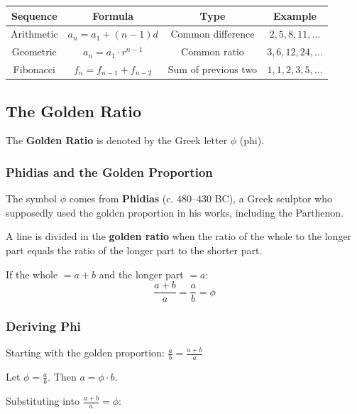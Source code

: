 \documentclass[11pt,a4paper]{article}
\begin{document}
\begin{center}
\begin{tabular}{c|c|c|c}
\toprule
\textbf{Sequence} & \textbf{Formula} & \textbf{Type} & \textbf{Example} \\
\midrule
Arithmetic & $a_n = a_1 + (n-1)d$ & Common difference & $2, 5, 8, 11, \ldots$ \\
Geometric & $a_n = a_1 \cdot r^{n-1}$ & Common ratio & $3, 6, 12, 24, \ldots$ \\
Fibonacci & $f_n = f_{n-1} + f_{n-2}$ & Sum of previous two & $1, 1, 2, 3, 5, \ldots$ \\
\bottomrule
\end{tabular}
\end{center}

\newpage

\subsection{The Golden Ratio}

The \textbf{Golden Ratio} is denoted by the Greek letter $\phi$ (phi).

\subsubsection{Phidias and the Golden Proportion}

The symbol $\phi$ comes from \textbf{Phidias} (c. 480--430 BC), a Greek sculptor who supposedly used the golden proportion in his works, including the Parthenon.

\begin{definitionbox}
A line is divided in the \textbf{golden ratio} when the ratio of the whole to the longer part equals the ratio of the longer part to the shorter part.

If the whole $= a + b$ and the longer part $= a$:
$$\frac{a + b}{a} = \frac{a}{b} = \phi$$
\end{definitionbox}

\subsubsection{Deriving Phi}

Starting with the golden proportion: $\displaystyle\frac{a}{b} = \frac{a + b}{a}$

Let $\phi = \displaystyle\frac{a}{b}$. Then $a = \phi \cdot b$.

Substituting into $\displaystyle\frac{a + b}{a} = \phi$:
\end{document}
